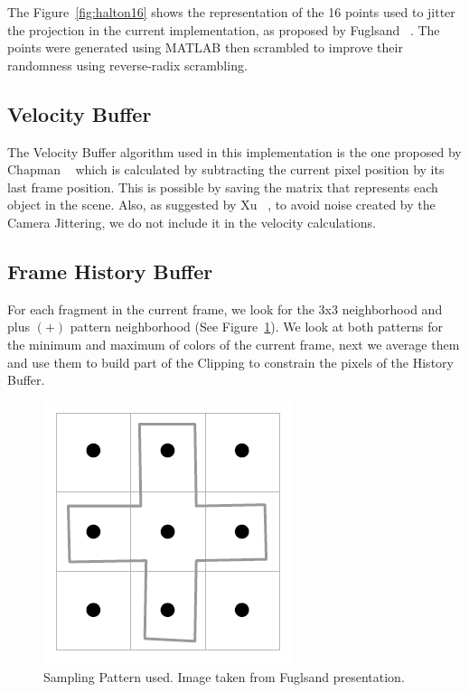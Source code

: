 \documentclass{cslthse-msc}
\begin{document}
The Figure~\ref{fig:halton16} shows the representation of the 16 points used to jitter the projection in the current implementation, as proposed by Fuglsand ~\cite{Fuglsand2016}. The points were generated using MATLAB then scrambled to improve their randomness using reverse-radix scrambling.

\subsection{Velocity Buffer}
The Velocity Buffer algorithm used in this implementation is the one proposed by Chapman ~\cite{Chapman2012} which is calculated by subtracting the current pixel position by its last frame position. This is possible by saving the matrix that represents each object in the scene. Also, as suggested by Xu ~\cite{XU2016}, to avoid noise created by the Camera Jittering, we do not include it in the velocity calculations.


\subsection{Frame History Buffer}
For each fragment in the current frame, we look for the 3x3 neighborhood and plus $(+)$ pattern neighborhood (See Figure~\ref{fig:samplingpattern}). We look at both patterns for the minimum and maximum of colors of the current frame, next we average them and use them to build part of the Clipping to constrain the pixels of the History Buffer. ~\cite{Fuglsand2016}

\begin{figure}[!hbt]
	\centering
	\includegraphics[scale=0.3]{images/sampling_pattern.png}
	\caption{Sampling Pattern used. Image taken from Fuglsand presentation. \protect\cite{Fuglsand2016}}\label{fig:samplingpattern}
\end{figure}
\end{document}
